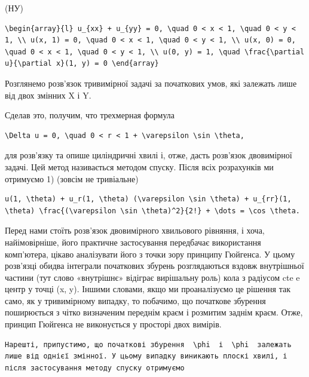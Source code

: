 \documentclass[
  ukrainian,
]{article}
\begin{document}
(НУ)

\begin{verbatim}
\begin{array}{l} u_{xx} + u_{yy} = 0, \quad 0 < x < 1, \quad 0 < y < 1, \\ u(x, 1) = 0, \quad 0 < x < 1, \quad 0 < y < 1, \\ u(x, 0) = 0, \quad 0 < x < 1, \quad 0 < y < 1, \\ u(0, y) = 1, \quad \frac{\partial u}{\partial x}(1, y) = 0 \end{array}
\end{verbatim}

Розглянемо розв'язок тривимірної задачі за початкових умов, які залежать
лише від двох змінних X і Y.

Сделав это, получим, что трехмерная формула

\begin{verbatim}
\Delta u = 0, \quad 0 < r < 1 + \varepsilon \sin \theta,
\end{verbatim}

для розв'язку та опише циліндричні хвилі і, отже, дасть розв'язок
двовимірної задачі. Цей метод називається методом спуску. Після всіх
розрахунків ми отримуємо 1) (зовсім не тривіальне)

\begin{verbatim}
u(1, \theta) + u_r(1, \theta) (\varepsilon \sin \theta) + u_{rr}(1, \theta) \frac{(\varepsilon \sin \theta)^2}{2!} + \dots = \cos \theta.
\end{verbatim}

Перед нами стоїть розв'язок двовимірного хвильового рівняння, і хоча,
найімовірніше, його практичне застосування передбачає використання
комп'ютера, цікаво аналізувати його з точки зору принципу Гюйгенса. У
цьому розв'язці обидва інтеграли початкових збурень розглядаються вздовж
внутрішньої частини (тут слово «внутрішнє» відіграє вирішальну роль)
кола з радіусом cte e центр у точці (x, y). Іншими словами, якщо ми
проаналізуємо це рішення так само, як у тривимірному випадку, то
побачимо, що початкове збурення поширюється з чітко визначеним переднім
краєм і розмитим заднім краєм. Отже, принцип Гюйгенса не виконується у
просторі двох вимірів.

\begin{verbatim}
Нарешті, припустимо, що початкові збурення  \phi  і  \phi  залежать лише від однієї змінної. У цьому випадку виникають плоскі хвилі, і після застосування методу спуску отримуємо
\end{verbatim}
\end{document}
